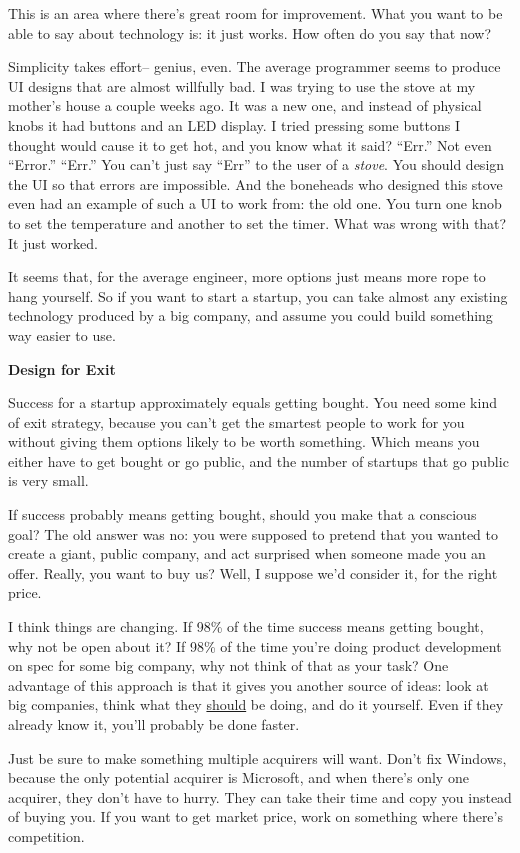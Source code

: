 This is an area where there's great room for improvement. What you want
to be able to say about technology is: it just works. How often do you
say that now?

Simplicity takes effort-- genius, even. The average programmer seems to
produce UI designs that are almost willfully bad. I was trying to use
the stove at my mother's house a couple weeks ago. It was a new one, and
instead of physical knobs it had buttons and an LED display. I tried
pressing some buttons I thought would cause it to get hot, and you know
what it said? ``Err.'' Not even ``Error.'' ``Err.'' You can't just say
``Err'' to the user of a \emph{stove}. You should design the UI so that
errors are impossible. And the boneheads who designed this stove even
had an example of such a UI to work from: the old one. You turn one knob
to set the temperature and another to set the timer. What was wrong with
that? It just worked.

It seems that, for the average engineer, more options just means more
rope to hang yourself. So if you want to start a startup, you can take
almost any existing technology produced by a big company, and assume you
could build something way easier to use.

\textbf{Design for Exit}

Success for a startup approximately equals getting bought. You need some
kind of exit strategy, because you can't get the smartest people to work
for you without giving them options likely to be worth something. Which
means you either have to get bought or go public, and the number of
startups that go public is very small.

If success probably means getting bought, should you make that a
conscious goal? The old answer was no: you were supposed to pretend that
you wanted to create a giant, public company, and act surprised when
someone made you an offer. Really, you want to buy us? Well, I suppose
we'd consider it, for the right price.

I think things are changing. If 98\% of the time success means getting
bought, why not be open about it? If 98\% of the time you're doing
product development on spec for some big company, why not think of that
as your task? One advantage of this approach is that it gives you
another source of ideas: look at big companies, think what they
\href{http://kiko.com}{should} be doing, and do it yourself. Even if
they already know it, you'll probably be done faster.

Just be sure to make something multiple acquirers will want. Don't fix
Windows, because the only potential acquirer is Microsoft, and when
there's only one acquirer, they don't have to hurry. They can take their
time and copy you instead of buying you. If you want to get market
price, work on something where there's competition.

